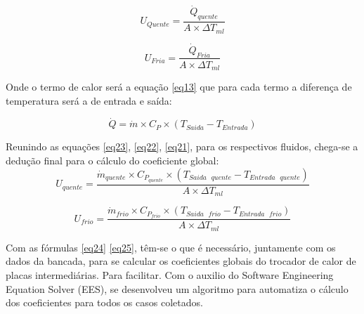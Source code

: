 \documentclass[a4paper,12pt,oneside]{article}
\begin{document}
\begin{flushright}
\begin{equation}\label{eq36}
U_{Quente} = \frac{\dot{Q}_{quente}}{A \times \Delta T_{ml}}
\end{equation}
\vspace{0.5cm}

\begin{equation}\label{eq37}
U_{Fria} = \frac{\dot{Q}_{Fria}}{A \times \Delta T_{ml}}
\end{equation}
\vspace{0.5cm}

Onde o termo de calor será a equação \ref{eq13} que para cada termo a diferença de temperatura será a de entrada e saída:

\begin{equation}\label{eq38}
\dot{Q} = \dot{m} \times C_{P} \times (T_{Saida} - T_{Entrada})
\end{equation}
\vspace{0.5cm}

Reunindo as equações \ref{eq23}, \ref{eq22}, \ref{eq21}, para os respectivos fluidos, chega-se a dedução final para o cálculo do coeficiente global:\\

\begin{equation}\label{eq39}
U_{quente} = \frac{\dot{m}_{quente} \times C_{P_{quente}} \times (T_{Saida\,\,\,\, quente} - T_{Entrada\,\,\,\, quente})}{A \times \Delta T_{ml}}
\end{equation}
\vspace{0.5cm}

\begin{equation}\label{eq40}
U_{frio} = \frac{\dot{m}_{frio} \times C_{P_{frio}} \times (T_{Saida\,\,\,\, frio} - T_{Entrada\,\,\,\, frio})}{A \times \Delta T_{ml}}
\end{equation}
\vspace{0.5cm}
	
	
Com as fórmulas \ref{eq24}	\ref{eq25}, têm-se o que é necessário, juntamente com os dados da bancada, para se calcular os coeficientes globais do trocador de calor de placas intermediárias. Para facilitar. Com o auxilio do Software Engineering Equation Solver (EES), se desenvolveu um algoritmo para automatiza o cálculo dos coeficientes para todos os casos coletados.
\pagebreak
\clearpage
\newpage



\end{flushright}
\end{document}
